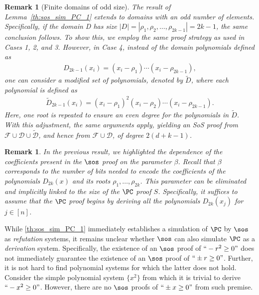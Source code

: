 \documentclass[11pt]{article}
\newtheorem{remark}[theorem]{Remark}
\begin{document}
\begin{remark}[Finite domains of odd size]
    The result of Lemma~\ref{th:sos_sim_PC_1} extends to domains with an odd number of elements. Specifically, if the domain D has size $|D| = |{\rho_1, \rho_2, \ldots, \rho_{2k - 1}}| = 2k - 1$, the same conclusion follows. To show this, we employ the same proof strategy as used in Cases 1, 2, and 3. However, in Case 4, instead of the domain polynomials defined as
    \begin{align*}
        D_{2k-1}(x_i) = (x_i - \rho_1)\cdots(x_i - \rho_{2k-1}),
    \end{align*}
    one can consider a modified set of polynomials, denoted by $\tilde{D}$, where each polynomial is defined as
    \begin{align*}
        \tilde{D}_{2k-1}(x_i) = (x_i - \rho_1)^2(x_i - \rho_2)\cdots(x_i - \rho_{2k-1}).
    \end{align*}
    Here, one root is repeated to ensure an even degree for the polynomials in $\tilde{D}$. With this adjustment, the same arguments apply, yielding an SoS proof from $\mathcal{F} \cup \mathcal{D} \cup \tilde{\mathcal{D}}$, and hence from $\mathcal{F} \cup \mathcal{D}$, of degree $2(d + k - 1)$.
\end{remark}

\begin{remark}
   In the previous result, we highlighted the dependence of the coefficients present in the $\sos$ proof on the parameter $\beta$. Recall that $\beta$ corresponds to the number of bits needed to encode the coefficients of the polynomials $D_{2k}(x)$ and its roots $\rho_1, \dots, \rho_{2k}$. This parameter can be eliminated and implicitly linked to the size of the $\PC$ proof $S$. Specifically, it suffices to assume that the $\PC$ proof begins by deriving all the polynomials $D_{2k}(x_j)$ for $j \in [n]$.
\end{remark}

While \cref{th:sos_sim_PC_1} immediately establishes a simulation of $\PC$ by $\sos$ as \emph{refutation} systems, it remains unclear whether $\sos$ can also simulate $\PC$ as a \emph{derivation} system. Specifically, the existence of an $\sos$ proof of $``-r^2 \geq 0"$ does not immediately guarantee the existence of an $\sos$ proof of $``\pm r \geq 0"$. Further, it is not hard to find polynomial systems for which the latter does not hold. Consider the simple polynomial system $\{ x^2\}$ from which it is trivial to derive $``-x^2 \geq 0"$. However, there are no $\sos$ proofs of $``\pm x \geq 0"$ from such premise.
\end{document}
